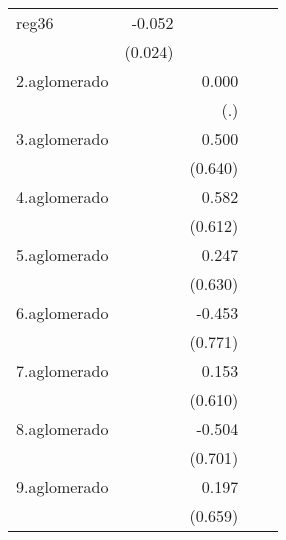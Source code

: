 {\begin{longtable}{l*{4}{D{.}{.}{-1}}}
\addlinespace
reg36       &      -0.052\sym{*}  &                     &                     &                     \\
            &     (0.024)         &                     &                     &                     \\
\addlinespace
2.aglomerado&                     &       0.000         &                     &                     \\
            &                     &         (.)         &                     &                     \\
\addlinespace
3.aglomerado&                     &       0.500         &                     &                     \\
            &                     &     (0.640)         &                     &                     \\
\addlinespace
4.aglomerado&                     &       0.582         &                     &                     \\
            &                     &     (0.612)         &                     &                     \\
\addlinespace
5.aglomerado&                     &       0.247         &                     &                     \\
            &                     &     (0.630)         &                     &                     \\
\addlinespace
6.aglomerado&                     &      -0.453         &                     &                     \\
            &                     &     (0.771)         &                     &                     \\
\addlinespace
7.aglomerado&                     &       0.153         &                     &                     \\
            &                     &     (0.610)         &                     &                     \\
\addlinespace
8.aglomerado&                     &      -0.504         &                     &                     \\
            &                     &     (0.701)         &                     &                     \\
\addlinespace
9.aglomerado&                     &       0.197         &                     &                     \\
            &                     &     (0.659)         &                     &                     \\

\end{longtable}}

